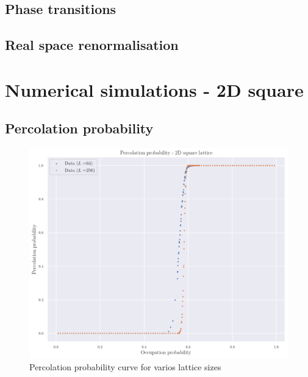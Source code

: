 \subsection{Phase transitions}

\subsection{Real space renormalisation}





\section{Numerical simulations - 2D square}\label{sec:2dsquare}

\subsection{Percolation probability}


\begin{figure}[H]
  \includegraphics[width=\linewidth]{Images/chap1_perc_prob_1.png}
  \caption{Percolation probability curve for varios lattice sizes}
  \label{fig:chap1_perc_prob_1}
\end{figure}


